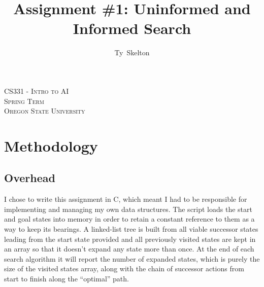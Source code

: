 \documentclass[10pt,draftclsnofoot,onecolumn]{IEEEtran}
\begin{document}
\singlespacing %
\title{Assignment \#1: Uninformed and Informed Search}

\author{Ty~Skelton}

\maketitle

\begin{center}
\scshape %
CS331 - Intro to AI \\  %
Spring Term\\[\baselineskip]    %
Oregon State University\par     %
\end{center}

\IEEEpeerreviewmaketitle

\newpage

\section{Methodology}
\subsection{Overhead}
I chose to write this assignment in C, which meant I had to be responsible for implementing and managing my own data structures.
The script loads the start and goal states into memory in order to retain a constant reference to them as a way to keep its bearings.
A linked-list tree is built from all viable successor states leading from the start state provided and all previously visited states are kept in an array so that it doesn't expand any state more than once.
At the end of each search algorithm it will report the number of expanded states, which is purely the size of the visited states array, along with the chain of successor actions from start to finish along the ``optimal'' path.
\end{document}
